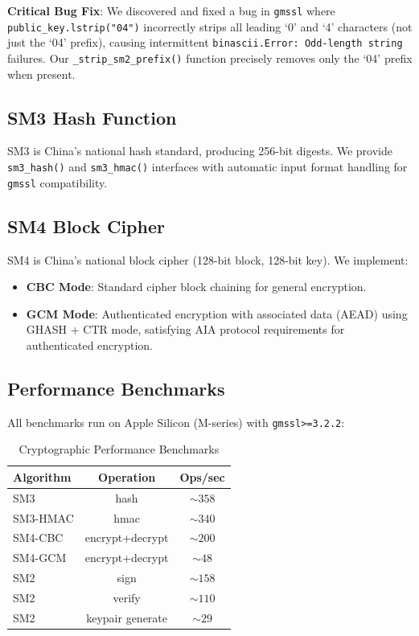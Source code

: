\documentclass[11pt,a4paper]{article}
\begin{document}
\textbf{Critical Bug Fix}: We discovered and fixed a bug in \texttt{gmssl} where \texttt{public\_key.lstrip("04")} incorrectly strips all leading `0' and `4' characters (not just the `04' prefix), causing intermittent \texttt{binascii.Error: Odd-length string} failures. Our \texttt{\_strip\_sm2\_prefix()} function precisely removes only the `04' prefix when present.

\subsection{SM3 Hash Function}

SM3 is China's national hash standard, producing 256-bit digests. We provide \texttt{sm3\_hash()} and \texttt{sm3\_hmac()} interfaces with automatic input format handling for \texttt{gmssl} compatibility.

\subsection{SM4 Block Cipher}

SM4 is China's national block cipher (128-bit block, 128-bit key). We implement:

\begin{itemize}
  \item \textbf{CBC Mode}: Standard cipher block chaining for general encryption.
  \item \textbf{GCM Mode}: Authenticated encryption with associated data (AEAD) using GHASH + CTR mode, satisfying AIA protocol requirements for authenticated encryption.
\end{itemize}

\subsection{Performance Benchmarks}

All benchmarks run on Apple Silicon (M-series) with \texttt{gmssl>=3.2.2}:

\begin{table}[ht]
\centering
\caption{Cryptographic Performance Benchmarks}
\label{tab:benchmarks}
\begin{tabular}{lcc}
\toprule
Algorithm & Operation & Ops/sec \\
\midrule
SM3 & hash & $\sim 358$ \\
SM3-HMAC & hmac & $\sim 340$ \\
SM4-CBC & encrypt+decrypt & $\sim 200$ \\
SM4-GCM & encrypt+decrypt & $\sim 48$ \\
SM2 & sign & $\sim 158$ \\
SM2 & verify & $\sim 110$ \\
SM2 & keypair generate & $\sim 29$ \\
\bottomrule
\end{tabular}
\end{table}
\end{document}
